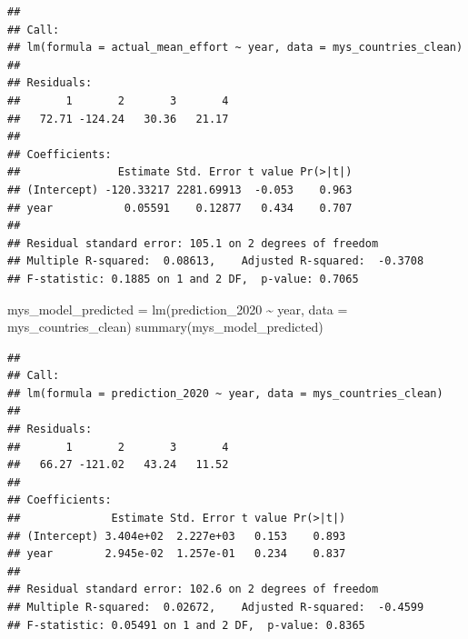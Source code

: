 \documentclass[
]{article}
\newenvironment{Shaded}{\begin{snugshade}}{\end{snugshade}}
\newcommand{\AttributeTok}[1]{\textcolor[rgb]{0.77,0.63,0.00}{#1}}
\newcommand{\CommentTok}[1]{\textcolor[rgb]{0.56,0.35,0.01}{\textit{#1}}}
\newcommand{\DecValTok}[1]{\textcolor[rgb]{0.00,0.00,0.81}{#1}}
\newcommand{\FunctionTok}[1]{\textcolor[rgb]{0.00,0.00,0.00}{#1}}
\newcommand{\NormalTok}[1]{#1}
\newcommand{\OtherTok}[1]{\textcolor[rgb]{0.56,0.35,0.01}{#1}}
\newcommand{\SpecialCharTok}[1]{\textcolor[rgb]{0.00,0.00,0.00}{#1}}
\begin{document}
\begin{verbatim}
## 
## Call:
## lm(formula = actual_mean_effort ~ year, data = mys_countries_clean)
## 
## Residuals:
##       1       2       3       4 
##   72.71 -124.24   30.36   21.17 
## 
## Coefficients:
##               Estimate Std. Error t value Pr(>|t|)
## (Intercept) -120.33217 2281.69913  -0.053    0.963
## year           0.05591    0.12877   0.434    0.707
## 
## Residual standard error: 105.1 on 2 degrees of freedom
## Multiple R-squared:  0.08613,    Adjusted R-squared:  -0.3708 
## F-statistic: 0.1885 on 1 and 2 DF,  p-value: 0.7065
\end{verbatim}

\begin{Shaded}
\begin{Highlighting}[]
\NormalTok{mys\_model\_predicted }\OtherTok{=} \FunctionTok{lm}\NormalTok{(prediction\_2020 }\SpecialCharTok{\textasciitilde{}}\NormalTok{ year, }\AttributeTok{data =}\NormalTok{ mys\_countries\_clean)}
\FunctionTok{summary}\NormalTok{(mys\_model\_predicted)}
\end{Highlighting}
\end{Shaded}

\begin{verbatim}
## 
## Call:
## lm(formula = prediction_2020 ~ year, data = mys_countries_clean)
## 
## Residuals:
##       1       2       3       4 
##   66.27 -121.02   43.24   11.52 
## 
## Coefficients:
##              Estimate Std. Error t value Pr(>|t|)
## (Intercept) 3.404e+02  2.227e+03   0.153    0.893
## year        2.945e-02  1.257e-01   0.234    0.837
## 
## Residual standard error: 102.6 on 2 degrees of freedom
## Multiple R-squared:  0.02672,    Adjusted R-squared:  -0.4599 
## F-statistic: 0.05491 on 1 and 2 DF,  p-value: 0.8365
\end{verbatim}

\begin{Shaded}
\end{Shaded}
\end{document}
